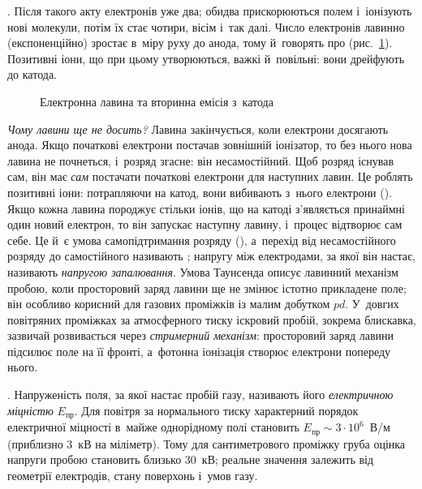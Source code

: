 . Після такого акту електронів уже два; обидва прискорюються
полем і~іонізують нові молекули, потім їх стає чотири, вісім і~так далі. Число електронів
лавинно (експоненційно) зростає в~міру руху до анода, тому й~говорять про
 (рис.~\ref{pic:Avalanche}). Позитивні іони, що при цьому
утворюються, важкі й~повільні: вони дрейфують до катода.

\begin{figure}[h!]\centering
	\caption{Електронна лавина та вторинна емісія з~катода\label{pic:Avalanche}}
\end{figure}

\emph{Чому лавини ще не досить?} Лавина закінчується, коли електрони досягають анода.
Якщо початкові електрони постачав зовнішній іонізатор, то без нього нова лавина не
почнеться, і~розряд згасне: він несамостійний. Щоб розряд існував сам, він має \emph{сам}
постачати початкові електрони для наступних лавин. Це роблять позитивні іони: потрапляючи
на катод, вони вибивають з~нього електрони (). Якщо кожна лавина
породжує стільки іонів, що на катоді з'являється принаймні один новий електрон, то він
запускає наступну лавину, і~процес відтворює сам себе. Це й~є умова самопідтримання
розряду (), а~перехід від несамостійного розряду до самостійного
називають ; напругу між електродами, за якої він настає, називають
\emph{напругою запалювання}. Умова Таунсенда описує лавинний механізм пробою, коли
просторовий заряд лавини ще не змінює істотно прикладене поле; він особливо корисний для
газових проміжків із малим добутком $pd$. У~довгих повітряних проміжках за атмосферного
тиску іскровий пробій, зокрема блискавка, зазвичай розвивається через \emph{стримерний
механізм}: просторовий заряд лавини підсилює поле на її фронті, а~фотонна іонізація створює
електрони попереду нього.

. Напруженість поля, за якої настає пробій газу, називають його
\emph{електричною міцністю} $E_{\text{пр}}$. Для повітря за нормального тиску характерний порядок електричної міцності в~майже
однорідному полі становить $E_{\text{пр}}\sim3\cdot10^{6}$~В/м (приблизно 3~кВ на
міліметр). Тому для сантиметрового проміжку груба оцінка напруги пробою становить близько
$30$~кВ; реальне значення залежить від геометрії електродів, стану поверхонь і~умов газу.



